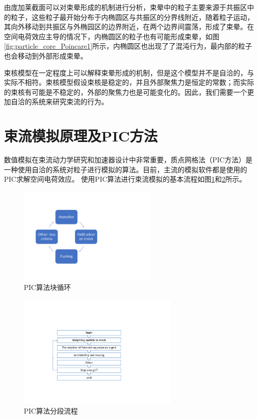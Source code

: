 由庞加莱截面可以对束晕形成的机制进行分析，束晕中的粒子主要来源于共振区中的粒子，这些粒子最开始分布于内椭圆区与共振区的分界线附近，随着粒子运动，其向外移动到共振区与外椭园区的边界附近，在两个边界间震荡，形成了束晕。在空间电荷效应主导的情况下，内椭圆区的粒子也有可能形成束晕，如图\ref{fig:particle_core_Poincare1}所示，内椭圆区也出现了了混沌行为，最内部的粒子也会移动到外部形成束晕。

束核模型在一定程度上可以解释束晕形成的机制，但是这个模型并不是自洽的，与实际不相符。束核模型假设束核是稳定的，并且外部聚焦力是恒定的常数；而实际的束核有可能是不稳定的，外部的聚焦力也是可能变化的。因此，我们需要一个更加自洽的系统来研究束流的行为。

\section{束流模拟原理及PIC方法}
\label{section:PIC_algorithm}
数值模拟在束流动力学研究和加速器设计中非常重要，质点网格法（PIC方法）是一种使用自洽的系统对粒子进行模拟的算法。目前，主流的模拟软件都是使用的PIC求解空间电荷效应\cite{PIC_Birdsall1991, PIC_friedman1992, PIC_ji2000, PIC_ji2004, PIC_Amundson2006229, PIC_tracewin2014, PIC_beampath2005}。
使用PIC算法进行束流模拟的基本流程如图\ref{fig:PICflow1}和\ref{fig:PICflow2}所示。

\begin{figure}[!tbh]
  \centering
    \includegraphics[width=0.6\textwidth]{Img/3_1_PIC.pdf}
    \caption{PIC算法块循环}
    \label{fig:PICflow1}
\end{figure}

\begin{figure}[!tbh]
  \centering
    \includegraphics[width=0.7\textwidth]{Img/3_1_PIC2.pdf}
    \caption{PIC算法分段流程}
    \label{fig:PICflow2}
\end{figure}

